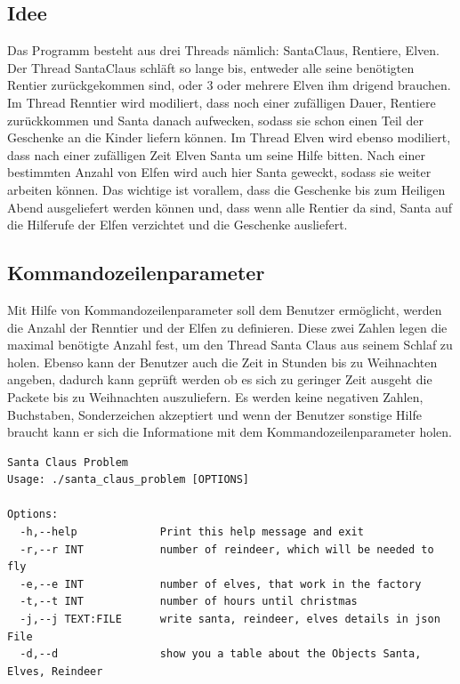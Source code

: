 \documentclass[a4paper,12pt]{exam}
\begin{document}
\subsection{Idee}
Das Programm besteht aus drei Threads nämlich: SantaClaus, Rentiere, Elven. Der Thread SantaClaus schläft so lange bis, entweder alle seine benötigten Rentier zurückgekommen sind, oder 3 oder mehrere Elven ihm drigend brauchen.
Im Thread Renntier wird modiliert, dass noch einer zufälligen Dauer, Rentiere zurückkommen und Santa danach aufwecken, sodass sie schon einen Teil der Geschenke an die Kinder liefern können. Im Thread Elven wird ebenso modiliert, dass
nach einer zufälligen Zeit Elven Santa um seine Hilfe bitten. Nach einer bestimmten Anzahl von Elfen wird auch hier Santa geweckt, sodass sie weiter arbeiten können. Das wichtige ist vorallem, dass die Geschenke bis zum Heiligen Abend
ausgeliefert werden können und, dass wenn alle Rentier da sind, Santa auf die Hilferufe der Elfen verzichtet und die Geschenke ausliefert.

\subsection{Kommandozeilenparameter}
Mit Hilfe von Kommandozeilenparameter soll dem Benutzer ermöglicht, werden die Anzahl der Renntier und der Elfen zu definieren. Diese zwei Zahlen legen die maximal benötigte Anzahl fest, um den Thread Santa Claus aus seinem Schlaf zu holen.
Ebenso kann der Benutzer auch die Zeit in Stunden bis zu Weihnachten angeben, dadurch kann geprüft werden ob es sich zu geringer Zeit ausgeht die Packete bis zu Weihnachten auszuliefern.
Es werden keine negativen Zahlen, Buchstaben, Sonderzeichen akzeptiert und wenn der Benutzer sonstige Hilfe braucht kann er sich die Informatione mit dem Kommandozeilenparameter holen.
\begin{verbatim}
Santa Claus Problem
Usage: ./santa_claus_problem [OPTIONS]

Options:
  -h,--help             Print this help message and exit
  -r,--r INT            number of reindeer, which will be needed to fly
  -e,--e INT            number of elves, that work in the factory
  -t,--t INT            number of hours until christmas
  -j,--j TEXT:FILE      write santa, reindeer, elves details in json File
  -d,--d                show you a table about the Objects Santa, Elves, Reindeer
\end{verbatim}
\end{document}
